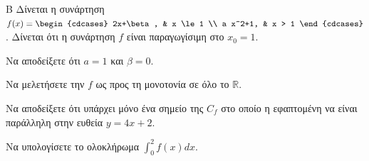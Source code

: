 \begin{thema}{Β}
Δίνεται η συνάρτηση $f(x) = \begin{cdcases} 2x+\beta, & x \le 1 \\ a x^2+1, & x > 1 \end{cdcases}$. Δίνεται ότι η συνάρτηση $f$ είναι παραγωγίσιμη στο $x_0 = 1$.
\begin{erwthma}
  \item Να αποδείξετε ότι $a=1$ και $\beta=0$.
  \item Να μελετήσετε την $f$ ως προς τη μονοτονία σε όλο το $\mathbb{R}$.
  \item Να αποδείξετε ότι υπάρχει μόνο ένα σημείο της $C_f$ στο οποίο η εφαπτομένη να είναι παράλληλη στην ευθεία $y = 4x+2$.
  \item Να υπολογίσετε το ολοκλήρωμα $\displaystyle\int_0^2 f(x)dx$.
\end{erwthma}
\end{thema}
